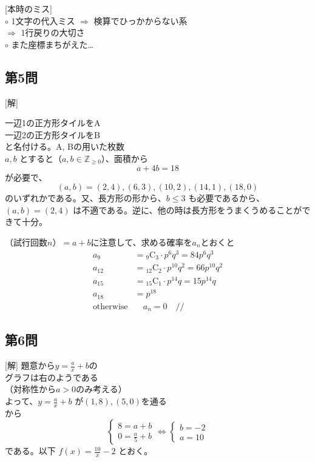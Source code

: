 \documentclass[../main.tex]{subfiles}
\begin{document}
{\color{cyan}
  [本時のミス]\\
  $\circ$ 1文字の代入ミス $\Rightarrow$ 検算でひっかからない系\\
  $\Rightarrow$ {\color{orange} 1行戻りの大切さ}\\
  $\circ$ また座標まちがえた\dots
}

\subsection*{第5問}
[解]
\begin{center}
\end{center}
一辺1の正方形タイルをA\\
一辺2の正方形タイルをB\\
と名付ける。A, Bの用いた枚数\\
$a, b$ とすると（$a, b \in \mathbb{Z}_{\ge 0}$）、面積から
\[ a + 4b = 18 \]
が必要で、
\[ (a, b) = (2, 4), (6, 3), (10, 2), (14, 1), (18, 0) \]
のいずれかである。又、長方形の形から、$b \le 3$ も必要であるから、$(a,b)=(2,4)$ は不適である。逆に、他の時は長方形をうまくうめることができて十分。

（試行回数$n$）$=a+b$に注意して、求める確率を$a_n$とおくと
\begin{align*}
  a_9 &= {}_9\mathrm{C}_3 \cdot p^6 q^3 = 84 p^6 q^3 \\
  a_{12} &= {}_{12}\mathrm{C}_2 \cdot p^{10} q^2 = 66 p^{10} q^2 \\
  a_{15} &= {}_{15}\mathrm{C}_1 \cdot p^{14} q = 15 p^{14} q \\
  a_{18} &= p^{18} \\
  \text{otherwise} &\quad a_n = 0 \quad //
\end{align*}

\subsection*{第6問}
[解] 題意から$y = \frac{a}{x} + b$の\\
グラフは右のようである\\
（対称性から$a>0$のみ考える）\\
よって、$y = \frac{a}{x} + b$ が$(1, 8), (5, 0)$を通る\\
から
\[
  \begin{cases}
    8 = a + b \\
    0 = \frac{a}{5} + b
  \end{cases}
  \Leftrightarrow
  \begin{cases}
    b = -2 \\
    a = 10
  \end{cases}
\]
である。以下 $f(x) = \frac{10}{x} - 2$ とおく。
\end{document}
